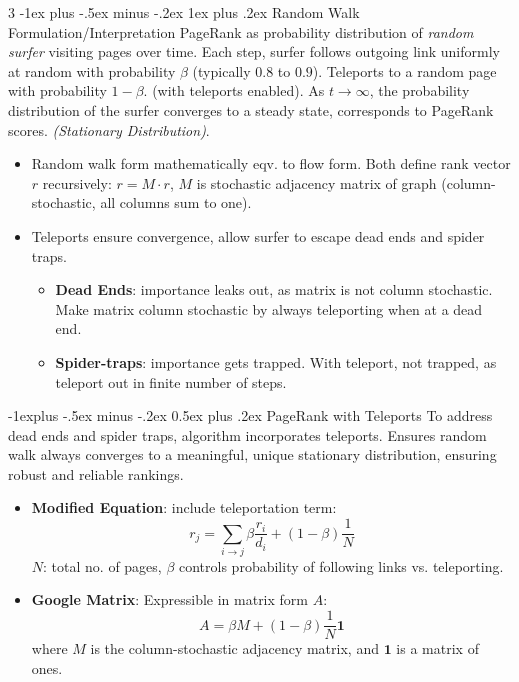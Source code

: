 \documentclass[a4paper, 9pt, landscape]{article}
\makeatletter
\renewcommand{\subsection}{\@startsection{subsection}{2}{0mm}%
                                {-1explus -.5ex minus -.2ex}%
                                {0.5ex plus .2ex}%
                                {\normalfont\normalsize\bfseries}}
\renewcommand{\subsubsection}{\@startsection{subsubsection}{3}{0mm}%
                                {-1ex plus -.5ex minus -.2ex}%
                                {1ex plus .2ex}%
                                {\normalfont\small\bfseries}}
\makeatother
\begin{document}
\begin{multicols*}{3}
\subsubsection{Random Walk Formulation/Interpretation}
PageRank as probability distribution of \textit{random surfer} visiting pages over time. Each step, surfer follows outgoing link uniformly at random with probability $ \beta $ (typically $ 0.8 $ to $ 0.9 $). Teleports to a random page with probability $ 1 - \beta $. (with teleports enabled). As $ t \to \infty $, the probability distribution of the surfer converges to a steady state, corresponds to PageRank scores. \textit{(Stationary Distribution)}.
\begin{itemize}
\item Random walk form mathematically eqv. to flow form. Both define rank vector $ r $ recursively: $r = M \cdot r$,  $ M $ is stochastic adjacency matrix of graph (column-stochastic, all columns sum to one).
\item Teleports ensure convergence, allow surfer to escape dead ends and spider traps.
	\begin{itemize}
	\item \textbf{Dead Ends}: importance leaks out, as matrix is not column stochastic. Make matrix column stochastic by always teleporting when at a dead end.
	\item \textbf{Spider-traps}: importance gets trapped. With teleport, not trapped, as teleport out in finite number of steps.
	\end{itemize}
\end{itemize}

\subsection{PageRank with Teleports}
To address dead ends and spider traps, algorithm incorporates teleports. Ensures random walk always converges to a meaningful, unique stationary distribution, ensuring robust and reliable rankings.

\begin{itemize}
\item \textbf{Modified Equation}: include teleportation term:
  \[
  r_j = \sum_{i \to j} \beta \frac{r_i}{d_i} + (1 - \beta) \frac{1}{N}
  \]
 $ N $: total no. of pages, $ \beta $ controls probability of following links vs. teleporting.
\item \textbf{Google Matrix}: Expressible in matrix form $A$:
  \[
  A = \beta M + (1 - \beta) \frac{1}{N} \mathbf{1}
  \]
  where $ M $ is the column-stochastic adjacency matrix, and $ \mathbf{1} $ is a matrix of ones.
\end{itemize}


\end{multicols*}
\end{document}
